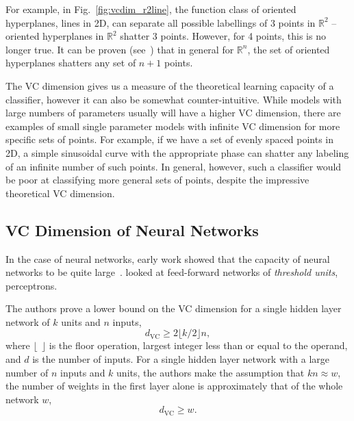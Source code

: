 \documentclass[thesis]{subfiles}
\begin{document}
    For example, in Fig.\ \ref{fig:vcdim_r2line}, the function class of oriented hyperplanes, \ie lines in 2D, can separate all possible labellings of 3 points in $\mathbb{R}^2$ -- oriented hyperplanes in $\mathbb{R}^2$ shatter 3 points. However, for 4 points, this is no longer true. It can be proven (see~\citet{burges1998tutorial}) that in general for $\mathbb{R}^n$, the set of oriented hyperplanes shatters any set of $n+1$ points.

    The VC dimension gives us a measure of the theoretical learning capacity of a classifier, however it can also be somewhat counter-intuitive. While models with large numbers of parameters usually will have a higher VC dimension, there are examples of small single parameter models with infinite VC dimension for more specific sets of points. For example, if we have a set of evenly spaced points in 2D, a simple sinusoidal curve with the appropriate phase can shatter any labeling of an infinite number of such points. In general, however, such a classifier would be poor at classifying more general sets of points, despite the impressive theoretical VC dimension.
    
    \subsection{VC Dimension of Neural Networks}
    In the case of neural networks, early work showed that the capacity of neural networks to be quite large~\citep{hornik89a,baum1989size}. \citet{baum1989size} looked at feed-forward networks of \emph{threshold units}, \ie perceptrons. %
    
    The authors prove a lower bound on the VC dimension for a single hidden layer network of $k$ units and $n$ inputs,
    \begin{equation}
        d_{\textrm{VC}} \geq 2 \lfloor k/2 \rfloor n,
    \end{equation}
    where $\lfloor \ \ \rfloor$ is the floor operation, \ie largest integer less than or equal to the operand, and $d$ is the number of inputs. For a single hidden layer network with a large number of $n$ inputs and $k$ units, the authors make the assumption that $kn\approx w$, \ie the number of weights in the first layer alone is approximately that of the whole network $w$,
    \begin{equation}
        d_{\textrm{VC}} \geq w.
    \end{equation}
\end{document}
